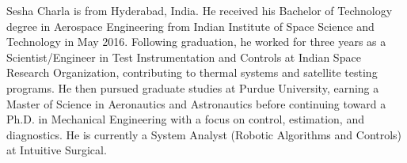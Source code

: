 \begin{vita}
    Sesha Charla is from Hyderabad, India. He received his Bachelor of Technology degree in Aerospace Engineering from
    Indian Institute of Space Science and Technology in May 2016. Following graduation, he worked for three years as a
    Scientist/Engineer in Test Instrumentation and Controls at Indian Space Research Organization, contributing to
    thermal systems and satellite testing programs. He then pursued graduate studies at Purdue University, earning a
    Master of Science in Aeronautics and Astronautics before continuing toward a Ph.D. in Mechanical Engineering with a
    focus on control, estimation, and diagnostics. He is currently a System Analyst (Robotic Algorithms and Controls) at
    Intuitive Surgical.
\end{vita}
